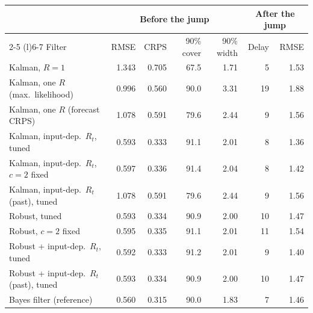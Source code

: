 \small
\begin{tabular}{@{}lrrrrrr@{}}
\toprule
 & \multicolumn{4}{c}{Before the jump} & \multicolumn{2}{c}{After the jump} \\
\cmidrule(lr){2-5} \cmidrule(l){6-7}
Filter & RMSE & CRPS & 90\% cover & 90\% width & Delay & RMSE \\
\midrule
Kalman, $R = 1$ & 1.343 & 0.705 & 67.5 & 1.71 & 5 & 1.53 \\
Kalman, one $R$ (max.\ likelihood) & 0.996 & 0.560 & 90.0 & 3.31 & 19 & 1.88 \\
Kalman, one $R$ (forecast CRPS) & 1.078 & 0.591 & 79.6 & 2.44 & 9 & 1.56 \\
\midrule
Kalman, input-dep.\ $R_t$, tuned & 0.593 & 0.333 & 91.1 & 2.01 & 8 & 1.36 \\
Kalman, input-dep.\ $R_t$, $c = 2$ fixed & 0.597 & 0.336 & 91.4 & 2.04 & 8 & 1.42 \\
Kalman, input-dep.\ $R_t$ (past), tuned & 1.078 & 0.591 & 79.6 & 2.44 & 9 & 1.56 \\
\midrule
Robust, tuned & 0.593 & 0.334 & 90.9 & 2.00 & 10 & 1.47 \\
Robust, $c = 2$ fixed & 0.595 & 0.335 & 91.1 & 2.01 & 11 & 1.54 \\
Robust + input-dep.\ $R_t$, tuned & 0.592 & 0.333 & 91.2 & 2.01 & 9 & 1.40 \\
Robust + input-dep.\ $R_t$ (past), tuned & 0.593 & 0.334 & 90.9 & 2.00 & 10 & 1.47 \\
\midrule
Bayes filter (reference) & 0.560 & 0.315 & 90.0 & 1.83 & 7 & 1.46 \\
\bottomrule
\end{tabular}
